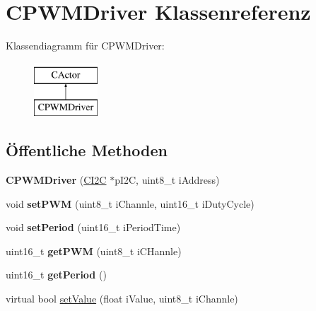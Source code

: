 \hypertarget{class_c_p_w_m_driver}{\section{\-C\-P\-W\-M\-Driver \-Klassenreferenz}
\label{class_c_p_w_m_driver}
}
\-Klassendiagramm für \-C\-P\-W\-M\-Driver\-:\begin{figure}[H]
\begin{center}
\leavevmode
\includegraphics[height=2.000000cm]{class_c_p_w_m_driver}
\end{center}
\end{figure}
\subsection*{Öffentliche \-Methoden}
\begin{DoxyCompactItemize}
\item 
\hypertarget{class_c_p_w_m_driver_a0ce7f67c234b48d234c3c7bcc4aaef62}{{\bfseries \-C\-P\-W\-M\-Driver} (\hyperlink{class_c_i2_c}{\-C\-I2\-C} $\ast$p\-I2\-C, uint8\-\_\-t i\-Address)}\label{class_c_p_w_m_driver_a0ce7f67c234b48d234c3c7bcc4aaef62}

\item 
\hypertarget{class_c_p_w_m_driver_a8d4599eac8535a08204a2a7a53c882fe}{void {\bfseries set\-P\-W\-M} (uint8\-\_\-t i\-Channle, uint16\-\_\-t i\-Duty\-Cycle)}\label{class_c_p_w_m_driver_a8d4599eac8535a08204a2a7a53c882fe}

\item 
\hypertarget{class_c_p_w_m_driver_ae8945a237fd6e4f5dfc68f867a7c8c43}{void {\bfseries set\-Period} (uint16\-\_\-t i\-Period\-Time)}\label{class_c_p_w_m_driver_ae8945a237fd6e4f5dfc68f867a7c8c43}

\item 
\hypertarget{class_c_p_w_m_driver_ad373149ae4a7047f6e38a372ab6cb446}{uint16\-\_\-t {\bfseries get\-P\-W\-M} (uint8\-\_\-t i\-C\-Hannle)}\label{class_c_p_w_m_driver_ad373149ae4a7047f6e38a372ab6cb446}

\item 
\hypertarget{class_c_p_w_m_driver_a021de939d6d981c6b961403943e58dd9}{uint16\-\_\-t {\bfseries get\-Period} ()}\label{class_c_p_w_m_driver_a021de939d6d981c6b961403943e58dd9}

\item 
virtual bool \hyperlink{class_c_p_w_m_driver_a91a128c891a11d64ba7a8d1486e77fab}{set\-Value} (float i\-Value, uint8\-\_\-t i\-Channle)
\end{DoxyCompactItemize}


